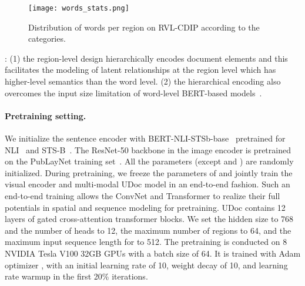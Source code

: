 \documentclass{article}
\begin{document}
	\begin{wrapfigure}{r}{0.5\textwidth}
		\vspace{-4mm}
		\centering
		\small
		\begin{center}
			\texttt{[image: words\_stats.png]}
			\vspace{-3mm}
			\caption{Distribution of words per region on RVL-CDIP according to the categories.}\label{fig:dist_wordregion}
		\end{center}
		\vspace{-7mm}
	\end{wrapfigure}
	: (1) {the} region-level design {hierarchically encodes document elements} {and this facilitates the modeling of latent relationships at the region level which has higher-level semantics than the word level.}
	(2) {the hierarchical encoding} {also} overcome{s} the input size limitation of {word-level} BERT-based models~\cite{xu2020layoutlm,xu2020layoutlmv2}.
	
	\paragraph{Pretraining setting.}
	We initialize the sentence encoder  with BERT-NLI-STSb-base~\cite{reimers-2019-sentence-bert} pretrained for NLI~\cite{williams2017broad} and STS-B~\cite{cer2017semeval}.
	The ResNet-50 backbone in the image encoder is pretrained on the PubLayNet training set~\cite{zhong2019publaynet}.
	All the parameters (except  and ) are randomly initialized. During pretraining, we freeze the parameter{s} of  and jointly train the {visual encoder and multi-modal UDoc} model {in an end-to-end fashion}. Such {an} end-to-end training {allows the ConvNet and Transformer to realize their full potentials in spatial and sequence modeling for pretraining.}
	UDoc contains 12 layers {of} gated cross-attention transformer blocks. We set the hidden size to 768 and the number of heads to 12, {the maximum number of regions  to 64, and the maximum input sequence length for } to 512.
	The pretraining is conducted on 8 NVIDIA Tesla V100 32GB GPUs with a batch size of 64. {It is trained with} Adam optimizer \cite{kingma2014adam}, with an initial learning rate of 10, weight decay of 10, and {learning rate warmup in the} first 20\% {iterations.}
	
\end{document}
